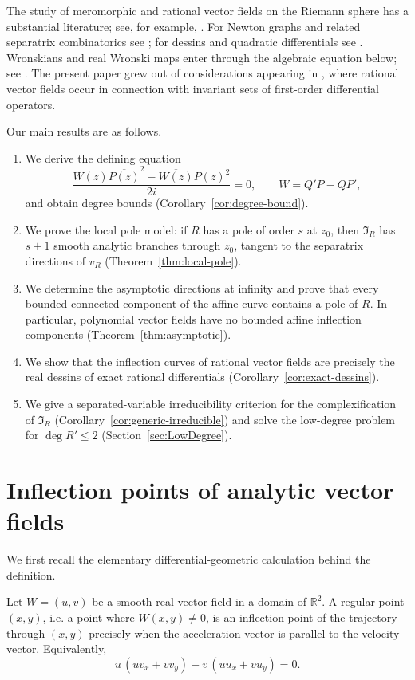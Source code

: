 \documentclass[11pt,reqno]{amsart}
\theoremstyle{definition}
\theoremstyle{remark}
\newcommand{\R}{\mathbb R}
\newcommand{\I}{\mathfrak I}
\begin{document}
The study of meromorphic and rational vector fields on the Riemann sphere has a substantial literature; see, for example, \cite{HajekI,HajekII,Benzinger,NeedhamKing,BrannerDias,DiasGarijo,Klimes,Fiedler}.  For Newton graphs and related separatrix combinatorics see \cite{STW}; for dessins and quadratic differentials see \cite{LandoZvonkin,Strebel}.  Wronskians and real Wronski maps enter through the algebraic equation below; see \cite{EG}.  The present paper grew out of considerations appearing in \cite{AHS}, where rational vector fields occur in connection with invariant sets of first-order differential operators.

Our main results are as follows.
\begin{enumerate}[label=(\roman*)]
\item We derive the defining equation
\[
        \frac{W(z)\overline{P(z)}^2-\overline{W(z)}P(z)^2}{2i}=0,
        \qquad W=Q'P-QP',
\]
and obtain degree bounds (Corollary~\ref{cor:degree-bound}).
\item We prove the local pole model: if $R$ has a pole of order $s$ at $z_0$, then $\I_R$ has $s+1$ smooth analytic branches through $z_0$, tangent to the separatrix directions of $v_R$ (Theorem~\ref{thm:local-pole}).
\item We determine the asymptotic directions at infinity and prove that every bounded connected component of the affine curve contains a pole of $R$. In particular, polynomial vector fields have no bounded affine inflection components (Theorem~\ref{thm:asymptotic}).
\item We show that the inflection curves of rational vector fields are precisely the real dessins of exact rational differentials (Corollary~\ref{cor:exact-dessins}).
\item We give a separated-variable irreducibility criterion for the complexification of $\I_R$ (Corollary~\ref{cor:generic-irreducible}) and solve the low-degree problem for $\deg R'\le2$ (Section~\ref{sec:LowDegree}).
\end{enumerate}

\section{Inflection points of analytic vector fields}

We first recall the elementary differential-geometric calculation behind the definition.

Let $W=(u,v)$ be a smooth real vector field in a domain of $\R^2$.  A regular point $(x,y)$, i.e. a point where $W(x,y)\ne0$, is an inflection point of the trajectory through $(x,y)$ precisely when the acceleration vector is parallel to the velocity vector.  Equivalently,
\begin{equation}\label{eq:general-inflection}
        u\,(u v_x+v v_y)-v\,(u u_x+v u_y)=0.
\end{equation}
\end{document}

